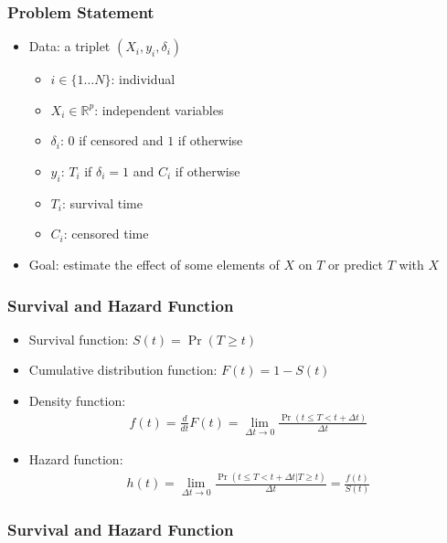 \documentclass[14pt]{beamer}
\begin{document}
	\begin{frame}
	\frametitle{Problem Statement}
	\begin{itemize}
	\item Data: a triplet $(X_i, y_i, \delta_i)$
	\begin{itemize}
	\item $i \in \{1 \dots N\}$: individual 
	\item $X_i \in \mathbb{R}^p$: independent variables
	\item $\delta_i$: $0$ if censored and $1$ if otherwise 
	\item $y_i$: $T_i$ if $\delta_i = 1$ and $C_i$ if otherwise 
	\item $T_i$: survival time
	\item $C_i$: censored time

	\end{itemize}
	\item Goal: estimate the effect of some elements of $X$ on $T$ or predict $T$ with $X$

	\end{itemize}
	\end{frame}

	\begin{frame}
	\frametitle{Survival and Hazard Function}
	\begin{itemize}
	\item Survival function: $S(t) = \Pr(T \geq t)$
	\item Cumulative distribution function: $F(t) = 1 - S(t)$
	\item Density function:
	\begin{eqnarray*}
	f(t) = \frac{d}{dt}F(t) = \lim_{\Delta t \to 0}\frac{\Pr(t \leq T < t + \Delta t)}{\Delta t}
	\end{eqnarray*}
	\item Hazard function:
	\begin{eqnarray*}
	h(t) = \lim_{\Delta t \to 0}\frac{\Pr(t \leq T < t + \Delta t | T \geq t)}{\Delta t} = \frac{f(t)}{S(t)}
	\end{eqnarray*}

	\end{itemize}
	\end{frame}

	\begin{frame}
	\frametitle{Survival and Hazard Function}
	\end{frame}
\end{document}
